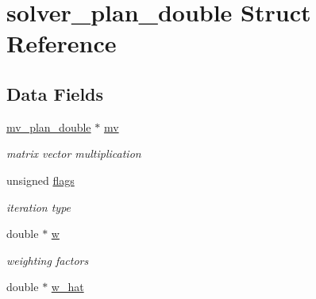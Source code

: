 \hypertarget{structsolver__plan__double}{
\section{solver\_\-plan\_\-double Struct Reference}
\label{structsolver__plan__double}
}
\subsection*{Data Fields}
\begin{CompactItemize}
\item 
\hypertarget{structsolver__plan__double_0d77b75f8122ee24d9ed1ca9f50f35be}{
\hyperlink{structmv__plan__double}{mv\_\-plan\_\-double} $\ast$ \hyperlink{structsolver__plan__double_0d77b75f8122ee24d9ed1ca9f50f35be}{mv}}
\label{structsolver__plan__double_0d77b75f8122ee24d9ed1ca9f50f35be}

\begin{CompactList}\small\item\em matrix vector multiplication \item\end{CompactList}\item 
\hypertarget{structsolver__plan__double_d4f6df9d890d106438ed0d3d725bf5b4}{
unsigned \hyperlink{structsolver__plan__double_d4f6df9d890d106438ed0d3d725bf5b4}{flags}}
\label{structsolver__plan__double_d4f6df9d890d106438ed0d3d725bf5b4}

\begin{CompactList}\small\item\em iteration type \item\end{CompactList}\item 
\hypertarget{structsolver__plan__double_dc2b7cea47756753ae9f8d5731f8d500}{
double $\ast$ \hyperlink{structsolver__plan__double_dc2b7cea47756753ae9f8d5731f8d500}{w}}
\label{structsolver__plan__double_dc2b7cea47756753ae9f8d5731f8d500}

\begin{CompactList}\small\item\em weighting factors \item\end{CompactList}\item 
\hypertarget{structsolver__plan__double_b16ed4ac6cf04f57c4b1f194fbc09472}{
double $\ast$ \hyperlink{structsolver__plan__double_b16ed4ac6cf04f57c4b1f194fbc09472}{w\_\-hat}}
\label{structsolver__plan__double_b16ed4ac6cf04f57c4b1f194fbc09472}


\end{CompactItemize}
